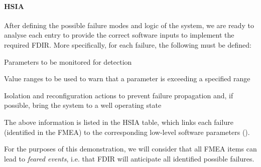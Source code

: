 \documentclass[a4paper,nobib]{tufte-book}
\begin{document}
\clearpage
\paragraph{\acl{HSIA}}

After defining the possible failure modes and logic of the system, we are ready to analyse each entry to provide the correct software inputs to implement the required \ac{FDIR}. More specifically, for each failure, the following must be defined: \autocite[84]{SAVOIR-HB-003}
\begin{compactitem}
	\item Parameters to be monitored for detection
	\item Value ranges to be used to warn that a parameter is exceeding a specified range
	\item Isolation and reconfiguration actions to prevent failure propagation and, if possible, bring the system to a well operating state
\end{compactitem}

The above information is listed in the \acf{HSIA} table, which links each failure (identified in the \acl{FMEA}) to the corresponding low-level software parameters ().

For the purposes of this demonstration, we will consider that all \ac{FMEA} items can lead to \emph{feared events}, i.e. that \ac{FDIR} will anticipate all identified possible failures.
\end{document}
